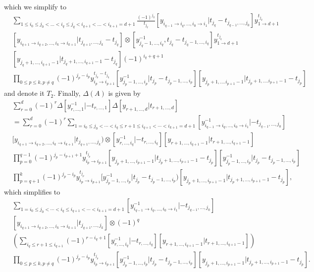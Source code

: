 which we simplify to
\begin{align*}
&\sum_{1\leq i_0\leq j_0<\dots<i_q\leq j_q<i_{q+1}<\dots<i_{k+1}=d+1}\frac{(-1)^{j_q}}{t_{j_q}}[y_{i_{q-1}\to i_q,\dots,i_0\to i_1}|t_{j_q}-t_{j_{q-1},\dots,j_0}]y_{1\to d+1}^{t_{j_q}}\\
&[y_{i_{q+1}\to i_{q+2},\dots,i_k\to i_{k+1}}|t_{j_{q+1},\dots,j_k}-t_{j_q}]\otimes[y_{j_q-1,\dots,i_q}^{-1},t_{j_q}-t_{j_q-1,\dots,i_q}]y_{1\to d+1}^{t_{j_q}}\\
&[y_{j_q+1,\dots,i_{q+1}-1}|t_{j_q+1,\dots,i_{q+1}-1}-t_{j_q}](-1)^{i_q+q+1}\\
&\prod_{0\leq p\leq k,p\neq q}(-1)^{j_p-i_p}y_{i_p\to i_{p+1}}^{t_{j_p}-t_{j_q}}[y_{j_p-1,\dots,i_p}^{-1}|t_{j_p}-t_{j_p-1,\dots,i_p}][y_{j_p+1,\dots.i_{p+1}-1}|t_{j_p+1,\dots.i_{p+1}-1}-t_{j_p}]
\end{align*}
and denote it $T_2$. Finally, $\Delta(A)$ is given by
\begin{align*}
&\sum_{r=0}^d(-1)^r\Delta[y_{r,\dots,1}^{-1}|-t_{r,\dots,1}]\Delta[y_{r+1,\dots,d}|t_{r+1,\dots,d}]\\
&=\sum_{r=0}^d(-1)^r\sum_{1=i_0\leq j_0<\cdots<i_q\leq r+1\leq i_{q+1}<\cdots<i_{k+1}=d+1}[y_{i_{q-1}\to i_q,\dots,i_0\to i_1}^{-1}|-t_{j_{q-1},\dots,j_0}]\\
&[y_{i_{q+1}\to i_{q+2},\dots,i_k\to i_{k+1}}|t_{j_{q+1},\dots,j_k})\otimes[y_{r,\dots,i_q}^{-1}|-t_{r,\dots,i_q}][y_{r+1,\dots,i_{q+1}-1}|t_{r+1,\dots,i_{q+1}-1}]\\
&\prod_{p=0}^{q-1}(-1)^{j_p-i_{p+1}+1}y_{i_p\to i_{p+1}}^{t_{j_p}}[y_{j_p+1,\dots,i_{p+1}-1}|t_{j_p+1,\dots,i_{p+1}-1}-t_{j_p}][y_{j_p-1,\dots,i_p}^{-1}|t_{j_p}-t_{j_p-1,\dots,i_p}]\\
&\prod_{p=q+1}^k(-1)^{j_p-i_p}y_{i_p\to i_{p+1}}^{t_{j_p}}[y_{j_p-1,\dots,i_p}^{-1}|t_{j_p}-t_{j_p-1,\dots,i_p})[y_{j_p+1,\dots,i_{p+1}-1}|t_{j_p+1,\dots,i_{p+1}-1}-t_{j_p}],
\end{align*}
which simplifies to
\begin{align*}
&\sum_{1=i_0\leq j_0<\cdots<i_q\leq i_{q+1}<\cdots<i_{k+1}=d+1}[y_{i_{q-1}\to i_q,\dots,i_0\to i_1}^{-1}|-t_{j_{q-1},\dots,j_0}]\\
&[y_{i_{q+1}\to i_{q+2},\dots,i_k\to i_{k+1}}|t_{j_{q+1},\dots,j_k}]\otimes(-1)^q\\
&\left(\sum_{i_q\leq r+1\leq i_{q+1}}(-1)^{r-i_q+1}[y_{r,\dots,i_q}^{-1}|-t_{r,\dots,i_q}][y_{r+1,\dots,i_{q+1}-1}|t_{r+1,\dots,i_{q+1}-1}]\right)\\
&\prod_{0\leq p\leq k,p\neq q}(-1)^{j_p-i_p}y_{i_p\to i_{p+1}}^{t_{j_p}}[y_{j_p-1,\dots,i_p}^{-1}|t_{j_p}-t_{j_p-1,\dots,i_p}][y_{j_p+1,\dots,i_{p+1}-1}|t_{j_p+1,\dots,i_{p+1}-1}-t_{j_p}].
\end{align*}
